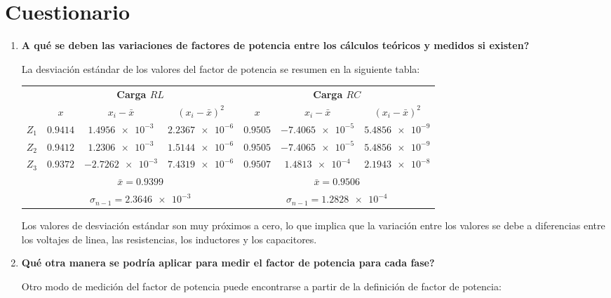 \documentclass[letter,11pt]{article}
\begin{document}
\section{Cuestionario}

\begin{enumerate}

\item \textbf{A qué se deben las variaciones de factores de potencia entre los
cálculos teóricos y medidos si existen?}

La desviación estándar de los valores del factor de potencia se resumen en la
siguiente tabla:
\begin{center}
    \begin{tabular}{|c||c|c|c||c|c|c|}
    \hline
    \multirow{2}{*}{} &
    \multicolumn{3}{|c||}{\textbf{Carga $RL$}} &
    \multicolumn{3}{|c|}{\textbf{Carga $RC$}}\\
        & $x$ & $x_i-\bar{x}$ & $(x_i-\bar{x})^2$
        & $x$ & $x_i-\bar{x}$ & $(x_i-\bar{x})^2$\\
    \hline \hline
    $Z_1$ &
    $0.9414$ &
    $\num{1.4956e-3}$ &
    $\num{2.2367e-6}$ &
    $0.9505$ &
    $\num{-7.4065e-5}$ &
    $\num{5.4856e-9}$
    \tabularnewline \hline
    $Z_2$ &
    $0.9412$ &
    $\num{1.2306e-3}$ &
    $\num{1.5144e-6}$ &
    $0.9505$ &
    $\num{-7.4065e-5}$ &
    $\num{5.4856e-9}$
    \tabularnewline \hline
    $Z_3$ &
    $0.9372$ &
    $\num{-2.7262e-3}$ &
    $\num{7.4319e-6}$ &
    $0.9507$ &
    $\num{1.4813e-4}$ &
    $\num{2.1943e-8}$
    \tabularnewline \hline \hline
        & \multicolumn{3}{|c||}{$\bar{x} = 0.9399$}
        & \multicolumn{3}{|c|}{$\bar{x} = 0.9506$}
    \tabularnewline \hline
        & \multicolumn{3}{|c||}{$\sigma_{n-1} = \num{2.3646e-3}$}
        & \multicolumn{3}{|c|}{$\sigma_{n-1} = \num{1.2828e-4}$}
    \tabularnewline \hline
    \end{tabular}
\end{center}

Los valores de desviación estándar son muy próximos a cero, lo que implica que
la variación entre los valores se debe a diferencias entre los voltajes de
linea, las resistencias, los inductores y los capacitores.

\item \textbf{Qué otra manera se podría aplicar para medir el factor de potencia
para cada fase?}

Otro modo de medición del factor de potencia puede encontrarse a partir de la
definición de factor de potencia:


\end{enumerate}
\end{document}
